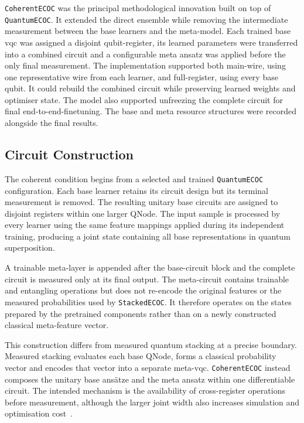 \documentclass[]{UCD_CS_MSc_AAI_Report}
\begin{document}
\texttt{CoherentECOC} was the principal methodological innovation built on top of \texttt{QuantumECOC}. It extended the direct ensemble while removing the intermediate measurement between the base learners and the meta-model. Each trained base \ac{vqc} was assigned a disjoint \gls{qubit-register}, its learned parameters were transferred into a combined circuit and a configurable meta ansatz was applied before the only final measurement. The implementation supported both \gls{main-wire}, using one representative wire from each learner, and \gls{full-register}, using every base qubit. It could rebuild the combined circuit while preserving learned weights and optimiser state. The model also supported unfreezing the complete circuit for final \gls{end-to-end-finetuning}. The base and meta resource structures were recorded alongside the final results.

\subsection{Circuit Construction}
The coherent condition begins from a selected and trained \texttt{QuantumECOC} configuration. Each base learner retains its circuit design but its terminal measurement is removed. The resulting unitary base circuits are assigned to disjoint registers within one larger QNode. The input sample is processed by every learner using the same feature mappings applied during its independent training, producing a joint state containing all base representations in quantum superposition.

A trainable meta-layer is appended after the base-circuit block and the complete circuit is measured only at its final output. The meta-circuit contains trainable and entangling operations but does not re-encode the original features or the measured probabilities used by \texttt{StackedECOC}. It therefore operates on the states prepared by the pretrained components rather than on a newly constructed classical meta-feature vector.

This construction differs from measured quantum stacking at a precise boundary. Measured stacking evaluates each base QNode, forms a classical probability vector and encodes that vector into a separate meta-\ac{vqc}. \texttt{CoherentECOC} instead composes the unitary base ansätze and the meta ansatz within one differentiable circuit. The intended mechanism is the availability of cross-register operations before measurement, although the larger joint width also increases simulation and optimisation cost~\cite{resch_quantum_2019,cerezo_challenges_2022}.
\end{document}
